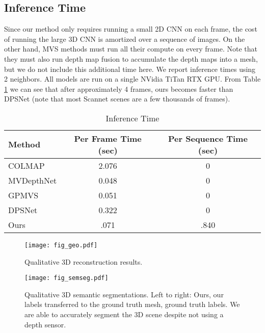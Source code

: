 \documentclass[runningheads]{llncs}
\begin{document}
\subsection{Inference Time}
Since our method only requires running a small 2D CNN on each frame, the cost of running the large 3D CNN is amortized over a sequence of images.
On the other hand, MVS methods must run all their compute on every frame.
Note that they must also run depth map fusion to accumulate the depth maps into a mesh, but we do not include this additional time here.
We report inference times using 2 neighbors.
All models are run on a single NVidia TiTan RTX GPU.
From Table \ref{tab:time} we can see that after approximately 4 frames, ours becomes faster than DPSNet (note that most Scannet scenes are a few thousands of frames).

\begin{table}[]
\centering
\caption{Inference Time}
\begin{tabular}{lcc}
\hline
Method & Per Frame Time (sec) & Per Sequence Time (sec)\\
\hline
COLMAP \cite{schoenberger2016mvs} & 2.076 & 0 \\
MVDepthNet \cite{wang2018mvdepthnet}& 0.048 & 0 \\
GPMVS \cite{hou2019multi} & 0.051 & 0 \\
DPSNet \cite{im2019dpsnet} & 0.322  & 0 \\
\midrule
Ours & .071 & .840 \\
\hline

\end{tabular}
\label{tab:time}
\end{table}


\begin{figure}
\centering
\texttt{[image: fig\_geo.pdf]}
\caption{Qualitative 3D reconstruction results.
}
\label{fig:geo1}
\end{figure}

\begin{figure}
\centering
\texttt{[image: fig\_semseg.pdf]}
\caption{Qualitative 3D semantic segmentations. Left to right: Ours, our labels transferred to the ground truth mesh, ground truth labels.
We are able to accurately segment the 3D scene despite not using a depth sensor.
}
\label{fig:semseg}
\end{figure}
\end{document}
